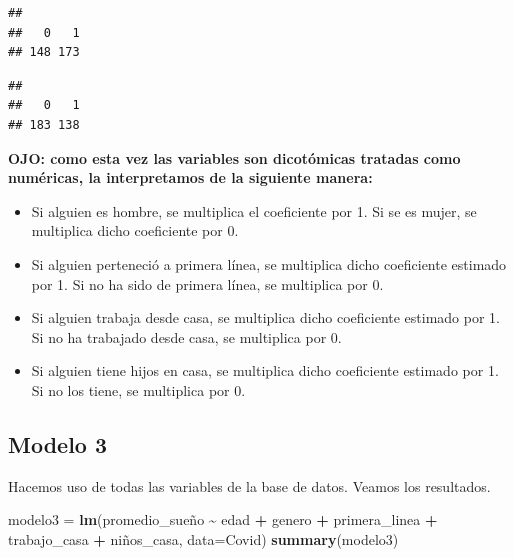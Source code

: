 \documentclass[
]{article}
\newenvironment{Shaded}{\begin{snugshade}}{\end{snugshade}}
\newcommand{\AttributeTok}[1]{\textcolor[rgb]{0.13,0.29,0.53}{#1}}
\newcommand{\FunctionTok}[1]{\textcolor[rgb]{0.13,0.29,0.53}{\textbf{#1}}}
\newcommand{\NormalTok}[1]{#1}
\newcommand{\OtherTok}[1]{\textcolor[rgb]{0.56,0.35,0.01}{#1}}
\newcommand{\SpecialCharTok}[1]{\textcolor[rgb]{0.81,0.36,0.00}{\textbf{#1}}}
\begin{document}
\begin{verbatim}
## 
##   0   1 
## 148 173
\end{verbatim}

\begin{Shaded}
\end{Shaded}

\begin{verbatim}
## 
##   0   1 
## 183 138
\end{verbatim}

\textbf{OJO: como esta vez las variables son dicotómicas tratadas como
numéricas, la interpretamos de la siguiente manera:}

\begin{itemize}
\item
  Si alguien es hombre, se multiplica el coeficiente por 1. Si se es
  mujer, se multiplica dicho coeficiente por 0.
\item
  Si alguien perteneció a primera línea, se multiplica dicho coeficiente
  estimado por 1. Si no ha sido de primera línea, se multiplica por 0.
\item
  Si alguien trabaja desde casa, se multiplica dicho coeficiente
  estimado por 1. Si no ha trabajado desde casa, se multiplica por 0.
\item
  Si alguien tiene hijos en casa, se multiplica dicho coeficiente
  estimado por 1. Si no los tiene, se multiplica por 0.
\end{itemize}

\subsection{\texorpdfstring{\textbf{Modelo
3}}{Modelo 3}}\label{modelo-3}

Hacemos uso de todas las variables de la base de datos. Veamos los
resultados.

\begin{Shaded}
\begin{Highlighting}[]
\NormalTok{modelo3 }\OtherTok{=} \FunctionTok{lm}\NormalTok{(promedio\_sueño }\SpecialCharTok{\textasciitilde{}}\NormalTok{ edad }\SpecialCharTok{+}\NormalTok{ genero }\SpecialCharTok{+}\NormalTok{ primera\_linea }\SpecialCharTok{+}\NormalTok{ trabajo\_casa }\SpecialCharTok{+}\NormalTok{ niños\_casa, }\AttributeTok{data=}\NormalTok{Covid)}
\FunctionTok{summary}\NormalTok{(modelo3)}
\end{Highlighting}
\end{Shaded}
\end{document}
